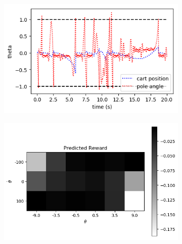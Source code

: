\documentclass{article}
\begin{document}
\begin{figure}[h]
	\centering
	\begin{subfigure}[t]{0.32\linewidth}
		\centering
		\includegraphics[width = 1.0\linewidth, trim={0 0 0 5}, clip=true]{figures/learn1000_xs_thetas.png}
		\label{fig:earlycart}	
	\end{subfigure}%
	\hspace{0.1\linewidth}
	\begin{subfigure}[t]{0.34\linewidth}
		\centering
		\includegraphics[width = 1.0\linewidth, trim={10 40 80 70}, clip=true]{figures/learnvs_vs.png}
		\label{fig:learned}	
	\end{subfigure}
\caption{}
\label{fig:balancing}
\end{figure}
\end{document}
